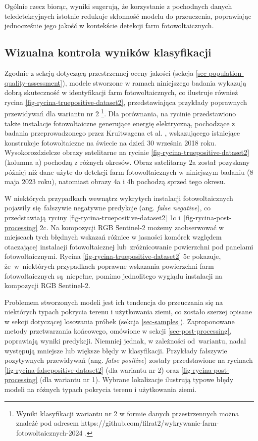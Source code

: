 \documentclass{amuthesis}
\begin{document}
Ogólnie rzecz biorąc, wyniki sugerują, że korzystanie z pochodnych
danych teledetekcyjnych istotnie redukuje skłonność modelu do
przeuczenia, poprawiając jednocześnie jego jakość w kontekście detekcji
farm fotowoltaicznych.

\hypertarget{sec-visual-quality-assessment}{%
\subsection{Wizualna kontrola wyników
klasyfikacji}\label{sec-visual-quality-assessment}}

Zgodnie z sekcją dotyczącą przestrzennej oceny jakości (sekcja
\ref{sec-population-quality-assessment}), modele stworzone w ramach
niniejszego badania wykazują dobrą skuteczność w identyfikacji farm
fotowoltaicznych, co ilustruje również rycina
\ref{fig-rycina-truepositive-dataset2}, przedstawiająca przykłady
poprawnych przewidywań dla wariantu nr 2 \footnote{Wyniki klasyfikacji
  wariantu nr 2 w formie danych przestrzennych można znaleźć pod adresem
  https://github.com/filrat2/wykrywanie-farm-fotowoltaicznych-2024 .}.
Dla porównania, na rycinie przedstawiono także instalacje fotowoltaiczne
generujące energię elektryczną, pochodzące z badania przeprowadzonego
przez Kruitwagena et al. \autocite*{kruitwagen_2021_pv}, wskazującego
istniejące konstrukcje fotowoltaiczne na świecie na dzień 30 września
2018 roku. Wysokorozdzielcze obrazy satelitarne na rycinie
\ref{fig-rycina-truepositive-dataset2} (kolumna a) pochodzą z różnych
okresów. Obraz satelitarny 2a został pozyskany później niż dane użyte do
detekcji farm fotowoltaicznych w niniejszym badaniu (8 maja 2023 roku),
natomiast obrazy 4a i 4b pochodzą sprzed tego okresu.

W niektórych przypadkach wewnątrz wykrytych instalacji fotowoltaicznych
pojawiły się~fałszywie negatywne predykcje (ang. \emph{false negative}),
co przedstawiają ryciny \ref{fig-rycina-truepositive-dataset2} 1c
i~\ref{fig-rycina-post-processing} 2c. Na kompozycji RGB Sentinel-2
możemy zaobserwować w miejscach tych błędnych wskazań różnice w jasności
komórek względem otaczającej instalacji fotowoltaicznej
lub~zróżnicowanie powierzchni pod panelami fotowoltaicznymi. Rycina
\ref{fig-rycina-truepositive-dataset2} 5c pokazuje, że~w~niektórych
przypadkach poprawne wskazania powierzchni farm fotowoltaicznych
są~niepełne, pomimo jednolitego wyglądu instalacji na kompozycji RGB
Sentinel-2.

Problemem stworzonych modeli jest ich tendencja do przeuczania się na
niektórych typach pokrycia terenu i użytkowania ziemi, co zostało
szerzej opisane w sekcji dotyczącej losowania próbek (sekcja
\ref{sec-samples}). Zaproponowane metody przetwarzania końcowego,
omówione w sekcji \ref{sec-post-processing}, poprawiają wyniki
predykcji. Niemniej jednak, w zależności od~wariantu, nadal występują
mniejsze lub większe błędy w klasyfikacji. Przykłady fałszywie
pozytywnych przewidywań (ang. \emph{false positive}) zostały
przedstawione na rycinach \ref{fig-rycina-falsepositive-dataset2} (dla
wariantu nr 2) oraz \ref{fig-rycina-post-processing} (dla wariantu nr
1). Wybrane lokalizacje ilustrują typowe błędy modeli na różnych typach
pokrycia terenu i użytkowania ziemi.
\end{document}
